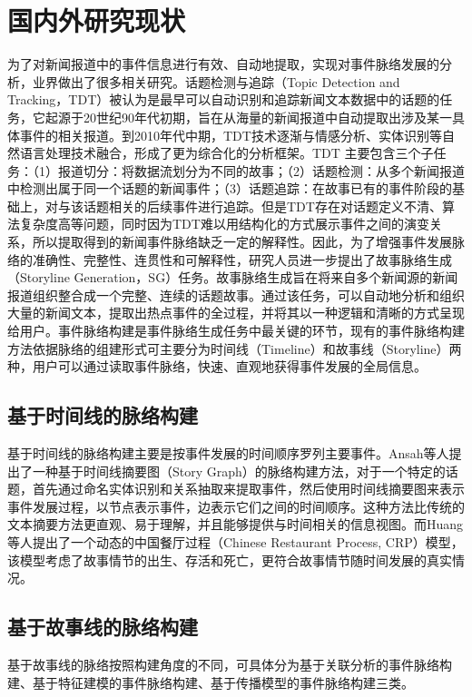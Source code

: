 \section{国内外研究现状}
为了对新闻报道中的事件信息进行有效、自动地提取，实现对事件脉络发展的分析，业界做出了很多相关研究。话题检测与追踪（Topic Detection and Tracking，TDT）被认为是最早可以自动识别和追踪新闻文本数据中的话题的任务，它起源于20世纪90年代初期，旨在从海量的新闻报道中自动提取出涉及某一具体事件的相关报道\cite{TDT}。到2010年代中期，TDT技术逐渐与情感分析、实体识别等自然语言处理技术融合，形成了更为综合化的分析框架。TDT 主要包含三个子任务：（1）报道切分：将数据流划分为不同的故事；（2）话题检测：从多个新闻报道中检测出属于同一个话题的新闻事件；（3）话题追踪：在故事已有的事件阶段的基础上，对与该话题相关的后续事件进行追踪。但是TDT存在对话题定义不清、算法复杂度高等问题，同时因为TDT难以用结构化的方式展示事件之间的演变关系，所以提取得到的新闻事件脉络缺乏一定的解释性\cite{TDT-disad}。因此，为了增强事件发展脉络的准确性、完整性、连贯性和可解释性，研究人员进一步提出了故事脉络生成（Storyline Generation，SG）任务\cite{SG}。故事脉络生成旨在将来自多个新闻源的新闻报道组织整合成一个完整、连续的话题故事。通过该任务，可以自动地分析和组织大量的新闻文本，提取出热点事件的全过程，并将其以一种逻辑和清晰的方式呈现给用户。事件脉络构建是事件脉络生成任务中最关键的环节，现有的事件脉络构建方法依据脉络的组建形式可主要分为时间线（Timeline）和故事线（Storyline）两种\cite{huang2013optimized}，用户可以通过读取事件脉络，快速、直观地获得事件发展的全局信息。

\subsection{基于时间线的脉络构建}
基于时间线的脉络构建主要是按事件发展的时间顺序罗列主要事件。Ansah等人\cite{Ansah2019graph}提出了一种基于时间线摘要图（Story Graph）的脉络构建方法，对于一个特定的话题，首先通过命名实体识别和关系抽取来提取事件，然后使用时间线摘要图来表示事件发展过程，以节点表示事件，边表示它们之间的时间顺序。这种方法比传统的文本摘要方法更直观、易于理解，并且能够提供与时间相关的信息视图。而Huang等人\cite{CRP}提出了一个动态的中国餐厅过程（Chinese Restaurant Process, CRP）模型，该模型考虑了故事情节的出生、存活和死亡，更符合故事情节随时间发展的真实情况。

\subsection{基于故事线的脉络构建}
基于故事线的脉络按照构建角度的不同，可具体分为基于关联分析的事件脉络构建、基于特征建模的事件脉络构建、基于传播模型的事件脉络构建三类\cite{TDT-disad}。


